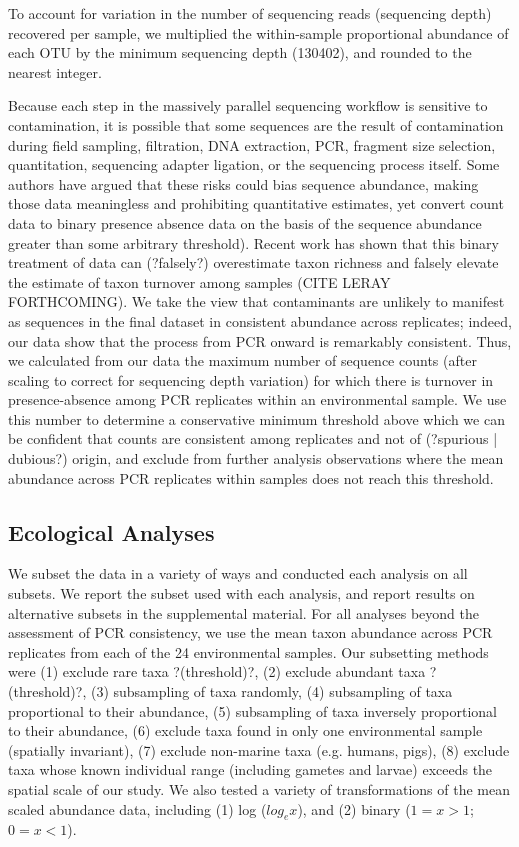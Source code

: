 \documentclass[11pt,letterpaper]{article} %
\begin{document}
To account for variation in the number of sequencing reads (sequencing depth) recovered per sample, we multiplied the within-sample proportional abundance of each OTU by the minimum sequencing depth (130402), and rounded to the nearest integer.

Because each step in the massively parallel sequencing workflow is sensitive to contamination, it is possible that some sequences are the result of contamination during field sampling, filtration, DNA extraction, PCR, fragment size selection, quantitation, sequencing adapter ligation, or the sequencing process itself.
Some authors have argued that these risks could bias sequence abundance, making those data meaningless and prohibiting quantitative estimates, yet convert count data to binary presence absence data on the basis of the sequence abundance greater than some arbitrary threshold). %
Recent work has shown that this binary treatment of data can (?falsely?) overestimate taxon richness and falsely elevate the estimate of taxon turnover among samples (CITE LERAY FORTHCOMING).
We take the view that contaminants are unlikely to manifest as sequences in the final dataset in consistent abundance across replicates; indeed, our data show that the process from PCR onward is remarkably consistent.
Thus, we calculated from our data the maximum number of sequence counts (after scaling to correct for sequencing depth variation) for which there is turnover in presence-absence among PCR replicates within an environmental sample.
We use this number to determine a conservative minimum threshold above which we can be confident that counts are consistent among replicates and not of (?spurious | dubious?) origin, and exclude from further analysis observations where the mean abundance across PCR replicates within samples does not reach this threshold. %




\subsection*{Ecological Analyses}

We subset the data in a variety of ways and conducted each analysis on all subsets.
We report the subset used with each analysis, and report results on alternative subsets in the supplemental material.
For all analyses beyond the assessment of PCR consistency, we use the mean taxon abundance across PCR replicates from each of the 24 environmental samples.
Our subsetting methods were (1) exclude rare taxa ?(threshold)?, (2) exclude abundant taxa ?(threshold)?, (3) subsampling of taxa randomly, (4) subsampling of taxa proportional to their abundance, (5) subsampling of taxa inversely proportional to their abundance, (6) exclude taxa found in only one environmental sample (spatially invariant), (7) exclude non-marine taxa (e.g. humans, pigs), (8) exclude taxa whose known individual range (including gametes and larvae) exceeds the spatial scale of our study.
We also tested a variety of transformations of the mean scaled abundance data, including (1) log ($log_{e}x$), and (2) binary ($1 = x > 1$; $0 = x < 1$).
\end{document}
